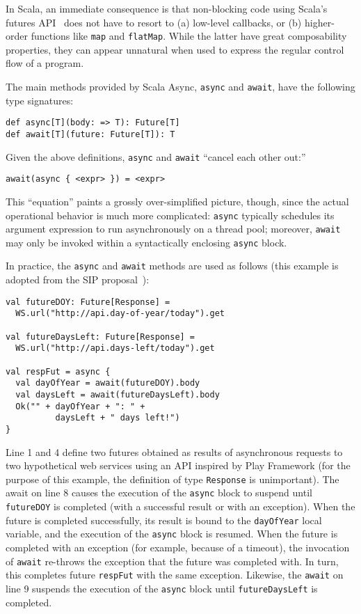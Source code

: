 \documentclass{acm_proc_article-sp}
\begin{document}
In Scala, an immediate consequence is that non-blocking code using Scala's
futures API~\cite{ScalaFuturesSIP} does not have to resort to (a) low-level
callbacks, or (b) higher-order functions like \verb|map| and \verb|flatMap|. While the
latter have great composability properties, they can appear unnatural when
used to express the regular control flow of a program.

The main methods provided by Scala Async, \verb|async| and \verb|await|, have
the following type signatures:

\begin{lstlisting}
def async[T](body: => T): Future[T]
def await[T](future: Future[T]): T
\end{lstlisting}

Given the above definitions, \verb|async| and \verb|await| ``cancel each other
out:''

\begin{lstlisting}
await(async { <expr> }) = <expr>
\end{lstlisting}

This ``equation'' paints a grossly over-simplified picture, though, since the
actual operational behavior is much more complicated: \verb|async| typically
schedules its argument expression to run asynchronously on a thread pool;
moreover, \verb|await| may only be invoked within a syntactically enclosing
\verb|async| block.

In practice, the \verb|async| and \verb|await| methods are used as follows
(this example is adopted from the SIP proposal~\cite{ScalaAsyncSIP}):

\lstset{numbers=left,xleftmargin=2em}
\begin{lstlisting}
val futureDOY: Future[Response] =
  WS.url("http://api.day-of-year/today").get

val futureDaysLeft: Future[Response] =
  WS.url("http://api.days-left/today").get

val respFut = async {
  val dayOfYear = await(futureDOY).body
  val daysLeft = await(futureDaysLeft).body
  Ok("" + dayOfYear + ": " +
          daysLeft + " days left!")
}
\end{lstlisting}

Line 1 and 4 define two futures obtained as results of asynchronous requests
to two hypothetical web services using an API inspired by Play Framework (for
the purpose of this example, the definition of type \verb|Response| is
unimportant). The await on line 8 causes the execution of the \verb|async|
block to suspend until \verb|futureDOY| is completed (with a successful result
or with an exception). When the future is completed successfully, its result
is bound to the \verb|dayOfYear| local variable, and the execution of the
\verb|async| block is resumed. When the future is completed with an exception
(for example, because of a timeout), the invocation of \verb|await| re-throws
the exception that the future was completed with. In turn, this completes
future \verb|respFut| with the same exception. Likewise, the \verb|await| on
line 9 suspends the execution of the \verb|async| block until
\verb|futureDaysLeft| is completed.
\end{document}
